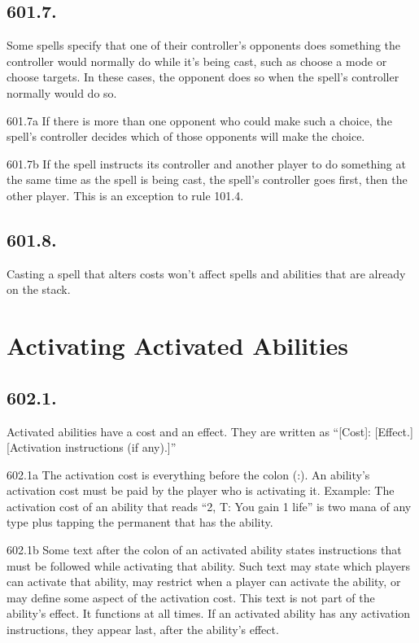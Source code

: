 \subsection*{601.7.}
Some spells specify that one of their controller’s opponents does something the controller would normally do while it’s being cast, such as choose a mode or choose targets. In these cases, the opponent does so when the spell’s controller normally would do so.

601.7a If there is more than one opponent who could make such a choice, the spell’s controller decides which of those opponents will make the choice.

601.7b If the spell instructs its controller and another player to do something at the same time as the spell is being cast, the spell’s controller goes first, then the other player. This is an exception to rule 101.4.

\subsection*{601.8.}
Casting a spell that alters costs won’t affect spells and abilities that are already on the stack.

\section{Activating Activated Abilities}
\subsection*{602.1.}
Activated abilities have a cost and an effect. They are written as “[Cost]: [Effect.] [Activation instructions (if any).]”

602.1a The activation cost is everything before the colon (:). An ability’s activation cost must be paid by the player who is activating it.
Example: The activation cost of an ability that reads “{2}, {T}: You gain 1 life” is two mana of any type plus tapping the permanent that has the ability.

602.1b Some text after the colon of an activated ability states instructions that must be followed while activating that ability. Such text may state which players can activate that ability, may restrict when a player can activate the ability, or may define some aspect of the activation cost. This text is not part of the ability’s effect. It functions at all times. If an activated ability has any activation instructions, they appear last, after the ability’s effect.

